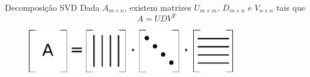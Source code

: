 \documentclass{beamer}
\begin{document}
\begin{frame}{Decomposi\c{c}\~ao SVD}
    Dada $A_{m \times n}$, existem matrizes $U_{m \times m}$, $D_{m \times n}$
    e $V_{n \times n}$ tais que
    \[A = UDV^T\]

    \pause

    \begin{figure}
        \centering
        \includegraphics[width=0.8\textwidth]{figs/svd1.pdf}
    \end{figure}
\end{frame}
\end{document}
